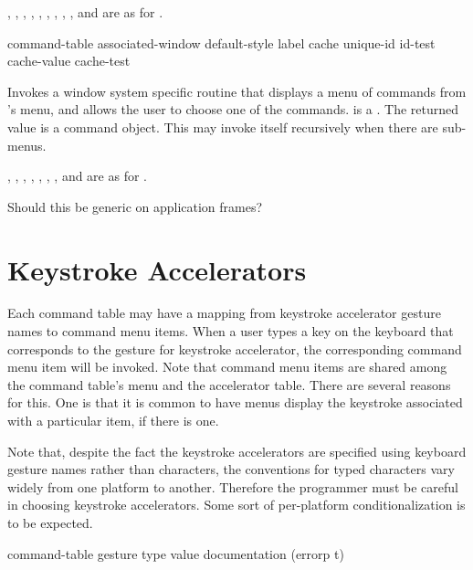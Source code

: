 , , , ,
, , , ,
, and  are as for .

 {command-table 
                                                 \key associated-window default-style label
                                                      cache unique-id id-test
                                                      cache-value cache-test}

Invokes a window system specific routine that displays a menu of commands from
's menu, and allows the user to choose one of the commands.
 is a .  The returned value is
a command object.  This may invoke itself recursively when there are sub-menus.

, , , ,
, , , and  are as
for .

 {Should this be generic on application frames?}


\section {Keystroke Accelerators}

Each command table may have a mapping from keystroke accelerator gesture names
to command menu items.  When a user types a key on the keyboard that corresponds
to the gesture for keystroke accelerator, the corresponding command menu item
will be invoked.  Note that command menu items are shared among the command
table's menu and the accelerator table.  There are several reasons for this.
One is that it is common to have menus display the keystroke associated with a
particular item, if there is one.

Note that, despite the fact the keystroke accelerators are specified using
keyboard gesture names rather than characters, the conventions for typed
characters vary widely from one platform to another.  Therefore the programmer
must be careful in choosing keystroke accelerators.  Some sort of per-platform
conditionalization is to be expected.


 {command-table gesture type value 
                                         \key documentation (errorp t)} 

